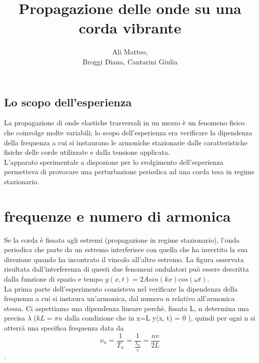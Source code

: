 \documentclass[a4paper]{article}
\title{Propagazione delle onde su una corda vibrante}
\author{Ali Matteo,\\Broggi Diana, Cantarini Giulia}
\date{ }
\theoremstyle{definition}
\begin{document}
	\maketitle
	\subsection*{Lo scopo dell'esperienza}
La propagazione di onde elastiche trasversali in un mezzo è un fenomeno fisico che coinvolge molte variabili; lo scopo dell'esperienza era verificare la dipendenza della frequenza a cui si instaurano le armoniche stazionarie dalle caratteristiche fisiche delle corde utilizzate e dalla tensione applicata.\\
L'apparato sperimentale a dispozione per lo svolgimento dell'esperienza permetteva di provocare una perturbazione periodica ad una corda tesa in regime stazionario. 
	
	\section{frequenze e numero di armonica}
	Se la corda è fissata agli estremi (propagazione in regime stazionario), l'onda periodica che parte da un estremo interferisce con quella che ha invertito la sua direzione quando ha incontrato il vincolo all'altro estremo. La figura osservata  risultata dall'interferenza di questi due fenomeni ondulatori può essere descritta dalla funzione di spazio e tempo \(y(x, t) = 2Asin(kx)cos(\omega t)\).\\
	
	\noindent La prima parte dell'esperimento consisteva nel verificare la dipendenza della frequenza a cui si instaura un'armonica, dal numero n relativo all'armonica stessa. Ci aspettiamo una dipendenza lineare perchè, fissata L, n determina una precisa \(\lambda\) (\(kL = \pi n\) dalla condizione che in x=L y(x, t) = 0 ), quindi per ogni n si otterrà una specifica frequenza data da \[\nu_{n} = \frac{1}{T_{n}} = \frac{1}{\frac{\lambda_{n}}{v}} = \frac{nv}{2L}\]
.\\\\\\\\\\\\\\\\\\\\\\\\	
\end{document}
